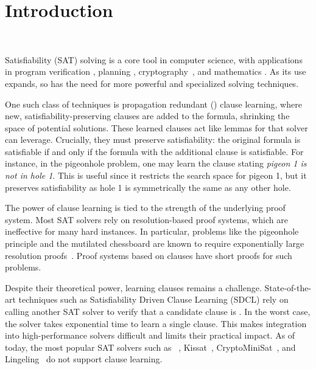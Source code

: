 \section{Introduction}~\label{sec:intro}


Satisfiability (SAT) solving is a core tool in computer science, with applications in program verification \cite{BillionQueries,sat-hardwareverification,ic3,bmc}, planning \cite{planning,planningassat}, cryptography~\cite{cryptominisat}, and mathematics \cite{chromaticnumber,pythagoreantriples,kellersconjecture,emptyhexagon}. As its use expands, so has the need for more powerful and specialized solving techniques.



One such class of techniques is propagation redundant (\pr) clause learning, where new, satisfiability-preserving clauses are added to the formula, shrinking the space of potential solutions. These learned clauses act like lemmas for that solver can leverage. Crucially, they must preserve satisfiability: the original formula is satisfiable if and only if the formula with the additional clause is satisfiable. For instance, in the pigeonhole problem, one may learn the clause stating \emph{pigeon 1 is not in hole 1}. This is useful since it restricts the search space for pigeon 1, but it preserves satisfiability as hole 1 is symmetrically the same as any other hole.



The power of clause learning is tied to the strength of the underlying proof system. Most SAT solvers rely on resolution-based proof systems, which are ineffective for many hard instances. In particular, problems like the pigeonhole principle and the mutilated chessboard are known to require exponentially large resolution proofs~\cite{hakenpigeonhole,mutilatedchessboard-exponential}. Proof systems based on \pr clauses have short proofs for such problems.

Despite their theoretical power, learning \pr clauses remains a challenge. State-of-the-art techniques such as Satisfiability Driven Clause Learning (SDCL) rely on calling another SAT solver to verify that a candidate clause is \pr \cite{sadical}. 
In the worst case, the solver takes exponential time to learn a single \pr clause. This makes integration into high-performance solvers difficult and limits their practical impact. As of today, the most popular SAT solvers such as \cadical~\cite{cadical}, Kissat~\cite{kissat}, CryptoMiniSat~\cite{cryptominisat}, and Lingeling~\cite{lingeling} do not support \pr clause learning.


